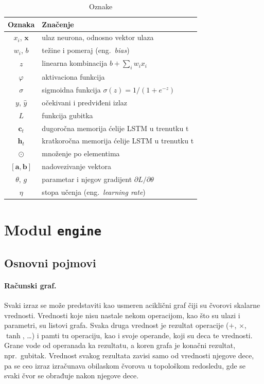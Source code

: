 \documentclass[11pt,a4paper]{article}
\newcommand{\eng}[1]{(eng.~\textit{#1})}
\newcommand{\vect}[1]{\mathbf{#1}}
\begin{document}
\begin{table}[h]
\centering
\begin{tabular}{cl}
\toprule
\textbf{Oznaka} & \textbf{Značenje} \\
\midrule
$x_i$, $\vect{x}$ & ulaz neurona, odnosno vektor ulaza \\
$w_i$, $b$ & težine i pomeraj \eng{bias} \\
$z$ & linearna kombinacija $b + \sum_i w_i x_i$ \\
$\varphi$ & aktivaciona funkcija \\
$\sigma$ & sigmoidna funkcija $\sigma(z) = 1/(1+e^{-z})$ \\
$y$, $\hat{y}$ & očekivani i predviđeni izlaz \\
$L$ & funkcija gubitka \\
$\vect{c}_t$ & dugoročna memorija ćelije LSTM u trenutku t \\
$\vect{h}_t$ & kratkoročna memorija ćelije LSTM u trenutku t \\
$\odot$ & množenje po elementima \\
$[\vect{a}, \vect{b}]$ & nadovezivanje vektora \\
$\theta$, $g$ & parametar i njegov gradijent $\partial L / \partial \theta$ \\
$\eta$ & stopa učenja \eng{learning rate} \\
\bottomrule
\end{tabular}
\caption{Oznake}
\end{table}

\section{Modul \texttt{engine}}
\label{sec:engine}

\subsection{Osnovni pojmovi}

\paragraph{Računski graf.} Svaki izraz se može predstaviti kao usmeren
aciklični graf čiji su čvorovi skalarne vrednosti. Vrednosti koje nisu nastale
nekom operacijom, kao što su ulazi i parametri, su listovi grafa.
Svaka druga vrednost je rezultat operacije ($+$, $\times$, $\tanh$, \dots)
i pamti tu operaciju, kao i svoje operande, koji su deca te vrednosti.
Grane vode od operanada ka rezultatu, a koren grafa je konačni rezultat,
npr.\ gubitak. Vrednost svakog rezultata zavisi samo od vrednosti njegove dece,
pa se ceo izraz izračunava obilaskom čvorova u topološkom redosledu,
gde se svaki čvor se obrađuje nakon njegove dece.
\end{document}
